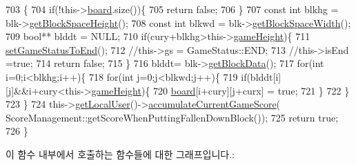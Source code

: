 \begin{DoxyCode}
703                                                                                   \{
704                 \textcolor{keywordflow}{if}(!this->\hyperlink{class_tetris_1_1_game_controller_a7725b6cec9459a6bffaa3e29dd1c5196}{board}.size())\{
705                     \textcolor{keywordflow}{return} \textcolor{keyword}{false};
706                 \}
707                 \textcolor{keyword}{const} \textcolor{keywordtype}{int} blkhg = blk->\hyperlink{class_tetris_1_1_block_a5301977e32c03aaf122fa289fcba77ba}{getBlockSpaceHeight}();
708                 \textcolor{keyword}{const} \textcolor{keywordtype}{int} blkwd = blk->\hyperlink{class_tetris_1_1_block_ac390e14de476582300d815d9054ed9bd}{getBlockSpaceWidth}();
709                  \textcolor{keywordtype}{bool}** blddt = NULL;
710                  \textcolor{keywordflow}{if}(cury+blkhg>this->\hyperlink{class_tetris_1_1_game_controller_a8e3adc647ed382de0ff541417bea9b33}{gameHeight})\{
711                      \hyperlink{class_tetris_1_1_game_controller_a3c5e6034b2e2faf70371a13eb5f9c5bb}{setGameStatusToEnd}();
712                      \textcolor{comment}{//this->gs = GameStatus::END;}
713                      \textcolor{comment}{//this->isEnd =true;}
714                     \textcolor{keywordflow}{return} \textcolor{keyword}{false};
715                  \}
716                 blddt= blk->\hyperlink{class_tetris_1_1_block_a9bd2c3d6ccacff9a5f56f72336ba324f}{getBlockData}();
717                 \textcolor{keywordflow}{for}(\textcolor{keywordtype}{int} i=0;i<blkhg;i++)\{
718                     \textcolor{keywordflow}{for}(\textcolor{keywordtype}{int} j=0;j<blkwd;j++)\{
719                         \textcolor{keywordflow}{if}(blddt[i][j]&&i+cury<this->\hyperlink{class_tetris_1_1_game_controller_a8e3adc647ed382de0ff541417bea9b33}{gameHeight})\{
720                             \hyperlink{class_tetris_1_1_game_controller_a7725b6cec9459a6bffaa3e29dd1c5196}{board}[i+cury][j+curx] = \textcolor{keyword}{true};
721                         \}
722                     \}
723                 \}
724                 this->\hyperlink{class_tetris_1_1_game_controller_abc67d4b309ce2886b43a3b4e0af22abc}{getLocalUser}()->\hyperlink{class_tetris_1_1_users_1_1_game_user_a5808d26769ba24d9e6435e40d3feb7af}{accumulateCurrentGameScore}(
      ScoreManagement::getScoreWhenPuttingFallenDownBlock());
725                 \textcolor{keywordflow}{return} \textcolor{keyword}{true};
726             \}
\end{DoxyCode}
이 함수 내부에서 호출하는 함수들에 대한 그래프입니다.\+:
